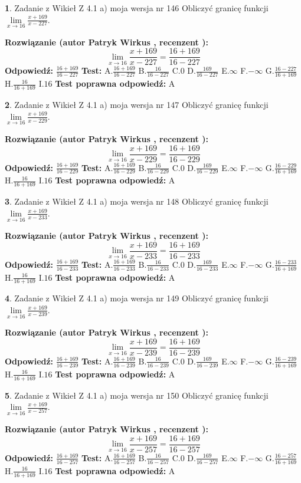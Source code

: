 \documentclass[12pt, a4paper]{article}
\theoremstyle{definition} %
\newtheorem{zad}{}
\newcommand{\zadStart}[1]{\begin{zad}#1\newline}
\newcommand{\zadStop}{\end{zad}}
\newcommand{\rozwStart}[2]{\noindent \textbf{Rozwiązanie (autor #1 , recenzent #2): }\newline}
\newcommand{\rozwStop}{\newline}
\newcommand{\odpStart}{\noindent \textbf{Odpowiedź:}\newline}
\newcommand{\odpStop}{\newline}
\newcommand{\testStart}{\noindent \textbf{Test:}\newline}
\newcommand{\testStop}{\newline}
\newcommand{\kluczStart}{\noindent \textbf{Test poprawna odpowiedź:}\newline}
\newcommand{\kluczStop}{\newline}
\begin{document}
\zadStart{Zadanie z Wikieł Z 4.1 a) moja wersja nr 146}
Obliczyć granicę funkcji $\lim\limits_{x\to16}\frac{x+169}{x-227}$.
\zadStop
\rozwStart{Patryk Wirkus}{}
$$\lim\limits_{x\to16}\frac{x+169}{x-227} = \frac{16+169}{16-227}$$
\rozwStop
\odpStart
$\frac{16+169}{16-227}$
\odpStop
\testStart
A.$\frac{16+169}{16-227}$
B.$\frac{16}{16-227}$
C.$0$
D.$\frac{169}{16-227}$
E.$\infty$
F.$-\infty$
G.$\frac{16-227}{16+169}$
H.$\frac{16}{16+169}$
I.$16$
\testStop
\kluczStart
A
\kluczStop



\zadStart{Zadanie z Wikieł Z 4.1 a) moja wersja nr 147}
Obliczyć granicę funkcji $\lim\limits_{x\to16}\frac{x+169}{x-229}$.
\zadStop
\rozwStart{Patryk Wirkus}{}
$$\lim\limits_{x\to16}\frac{x+169}{x-229} = \frac{16+169}{16-229}$$
\rozwStop
\odpStart
$\frac{16+169}{16-229}$
\odpStop
\testStart
A.$\frac{16+169}{16-229}$
B.$\frac{16}{16-229}$
C.$0$
D.$\frac{169}{16-229}$
E.$\infty$
F.$-\infty$
G.$\frac{16-229}{16+169}$
H.$\frac{16}{16+169}$
I.$16$
\testStop
\kluczStart
A
\kluczStop



\zadStart{Zadanie z Wikieł Z 4.1 a) moja wersja nr 148}
Obliczyć granicę funkcji $\lim\limits_{x\to16}\frac{x+169}{x-233}$.
\zadStop
\rozwStart{Patryk Wirkus}{}
$$\lim\limits_{x\to16}\frac{x+169}{x-233} = \frac{16+169}{16-233}$$
\rozwStop
\odpStart
$\frac{16+169}{16-233}$
\odpStop
\testStart
A.$\frac{16+169}{16-233}$
B.$\frac{16}{16-233}$
C.$0$
D.$\frac{169}{16-233}$
E.$\infty$
F.$-\infty$
G.$\frac{16-233}{16+169}$
H.$\frac{16}{16+169}$
I.$16$
\testStop
\kluczStart
A
\kluczStop



\zadStart{Zadanie z Wikieł Z 4.1 a) moja wersja nr 149}
Obliczyć granicę funkcji $\lim\limits_{x\to16}\frac{x+169}{x-239}$.
\zadStop
\rozwStart{Patryk Wirkus}{}
$$\lim\limits_{x\to16}\frac{x+169}{x-239} = \frac{16+169}{16-239}$$
\rozwStop
\odpStart
$\frac{16+169}{16-239}$
\odpStop
\testStart
A.$\frac{16+169}{16-239}$
B.$\frac{16}{16-239}$
C.$0$
D.$\frac{169}{16-239}$
E.$\infty$
F.$-\infty$
G.$\frac{16-239}{16+169}$
H.$\frac{16}{16+169}$
I.$16$
\testStop
\kluczStart
A
\kluczStop



\zadStart{Zadanie z Wikieł Z 4.1 a) moja wersja nr 150}
Obliczyć granicę funkcji $\lim\limits_{x\to16}\frac{x+169}{x-257}$.
\zadStop
\rozwStart{Patryk Wirkus}{}
$$\lim\limits_{x\to16}\frac{x+169}{x-257} = \frac{16+169}{16-257}$$
\rozwStop
\odpStart
$\frac{16+169}{16-257}$
\odpStop
\testStart
A.$\frac{16+169}{16-257}$
B.$\frac{16}{16-257}$
C.$0$
D.$\frac{169}{16-257}$
E.$\infty$
F.$-\infty$
G.$\frac{16-257}{16+169}$
H.$\frac{16}{16+169}$
I.$16$
\testStop
\kluczStart
A
\kluczStop
\end{document}
